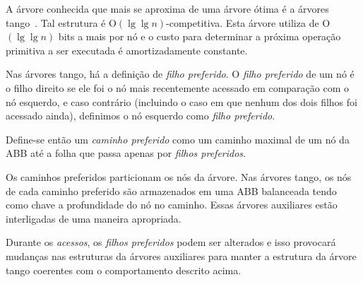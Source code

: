 A árvore conhecida que mais se aproxima de uma árvore ótima é a árvores tango~\cite{dynamicoptimality}. Tal estrutura é O$(\lg \lg n)$-competitiva. Esta árvore utiliza de O$(\lg \lg n)$ bits a mais por nó e o custo para determinar a próxima operação primitiva a ser executada é amortizadamente constante.

Nas árvores tango, há a definição de \textit{filho preferido}. O \textit{filho preferido} de um nó é o filho direito se ele foi o nó mais recentemente acessado em comparação com o nó esquerdo, e caso contrário (incluindo o caso em que nenhum dos dois filhos foi acessado ainda), definimos o nó esquerdo como \textit{filho preferido}.

Define-se então um \textit{caminho preferido} como um caminho maximal de um nó da ABB até a folha que passa apenas por \textit{filhos preferidos}. 

Os caminhos preferidos particionam os nós da árvore. Nas árvores tango, os nós de cada caminho preferido são armazenados em uma ABB balanceada tendo como chave a profundidade do nó no caminho. Essas árvores auxiliares estão interligadas de uma maneira apropriada.

Durante os \textit{acessos}, os \textit{filhos preferidos} podem ser alterados e isso provocará mudanças nas estruturas da árvores auxiliares para manter a estrutura da árvore tango coerentes com o comportamento descrito acima.

